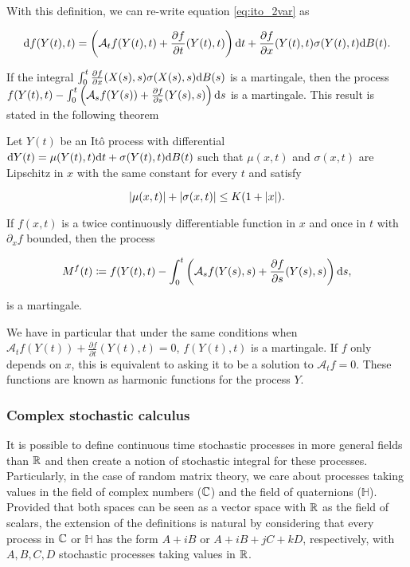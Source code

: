 With this definition, we can re-write equation \eqref{eq:ito_2var} as

\begin{equation*}
    \mathrm d f (Y(t),t) = \left( \mathcal A_t f(Y(t),t) + \frac{\partial f}{\partial t}(Y(t),t) \right) \mathrm d t + \frac{\partial f}{\partial x}(Y(t),t)\sigma(Y(t),t) \mathrm d B(t).
\end{equation*}

If the integral $\int_0^t \frac{\partial f}{\partial x}(X(s),s)\sigma(X(s),s) \mathrm d B(s)$ is a martingale, then the process $f(Y(t),t) - \int_0^t \left( \mathcal A_s f(Y(s)) + \frac{\partial f}{\partial s}(Y(s),s) \right) \mathrm d s$ is a martingale. This result is stated in the following theorem

\begin{theorem}
    Let $Y(t)$ be an Itô process with differential $\mathrm d Y(t) = \mu(Y(t),t) \mathrm d t + \sigma(Y(t),t)\mathrm d B(t)$ such that $\mu(x,t)$ and $\sigma(x,t)$ are Lipschitz in $x$ with the same constant for every $t$ and satisfy

    \begin{equation*}
        \lvert \mu(x,t) \rvert + \lvert \sigma(x,t) \rvert \le K(1 + \lvert x \rvert).
    \end{equation*}

    If $f(x,t)$ is a twice continuously differentiable function in $x$ and once in $t$ with $\partial_x f$ bounded, then the process 

    \begin{equation*}
        M^f(t) \coloneqq f(Y(t),t) - \int_0^t \left( \mathcal A_s f(Y(s),s) + \frac{\partial f}{\partial s}(Y(s),s) \right) \mathrm d s,
    \end{equation*}

    \noindent is a martingale.
\end{theorem}

We have in particular that under the same conditions when $\mathcal A_t f(Y(t)) + \frac{\partial f}{\partial t}(Y(t),t) = 0$, $f(Y(t),t)$ is a martingale. If $f$ only depends on $x$, this is equivalent to asking it to be a solution to $\mathcal A_t f = 0$. These functions are known as harmonic functions for the process $Y$.


\subsubsection{Complex stochastic calculus}


It is possible to define continuous time stochastic processes in more general fields than $\mathbb R$ and then create a notion of stochastic integral for these processes. Particularly, in the case of random matrix theory, we care about processes taking values in the field of complex numbers ($\mathbb C$) and the field of quaternions ($\mathbb H$). Provided that both spaces can be seen as a vector space with $\mathbb R$ as the field of scalars, the extension of the definitions is natural by considering that every process in $\mathbb C$ or $\mathbb H$ has the form $A + i B$ or $A + i B + j C + k D$, respectively, with $A, B, C, D$ stochastic processes taking values in $\mathbb R$.

